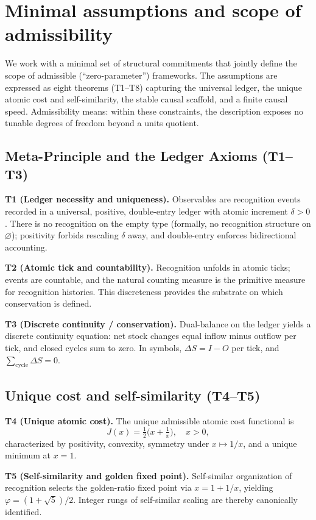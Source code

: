 \documentclass[11pt]{article}
\begin{document}
\section{Minimal assumptions and scope of admissibility}
We work with a minimal set of structural commitments that jointly define the scope of admissible (``zero\mbox{-}parameter'') frameworks. The assumptions are expressed as eight theorems (T1--T8) capturing the universal ledger, the unique atomic cost and self\mbox{-}similarity, the stable causal scaffold, and a finite causal speed. Admissibility means: within these constraints, the description exposes no tunable degrees of freedom beyond a units quotient.

\subsection{Meta\mbox{-}Principle and the Ledger Axioms (T1--T3)}
\textbf{T1 (Ledger necessity and uniqueness).} Observables are recognition events recorded in a universal, positive, double\mbox{-}entry ledger with atomic increment \(\delta>0\). There is no recognition on the empty type (formally, no recognition structure on \(\varnothing\)); positivity forbids rescaling \(\delta\) away, and double\mbox{-}entry enforces bidirectional accounting.

\textbf{T2 (Atomic tick and countability).} Recognition unfolds in atomic ticks; events are countable, and the natural counting measure is the primitive measure for recognition histories. This discreteness provides the substrate on which conservation is defined.

\textbf{T3 (Discrete continuity / conservation).} Dual\mbox{-}balance on the ledger yields a discrete continuity equation: net stock changes equal inflow minus outflow per tick, and closed cycles sum to zero. In symbols, \(\Delta S=I-O\) per tick, and \(\sum_{\text{cycle}}\Delta S=0\).

\subsection{Unique cost and self\mbox{-}similarity (T4--T5)}
\textbf{T4 (Unique atomic cost).} The unique admissible atomic cost functional is
\[ J(x)=\tfrac{1}{2}\bigl(x+\tfrac{1}{x}\bigr), \quad x>0, \]
characterized by positivity, convexity, symmetry under \(x\mapsto 1/x\), and a unique minimum at \(x=1\).

\textbf{T5 (Self\mbox{-}similarity and golden fixed point).} Self\mbox{-}similar organization of recognition selects the golden\mbox{-}ratio fixed point via \(x=1+1/x\), yielding \(\varphi=(1+\sqrt{5})/2\). Integer rungs of self\mbox{-}similar scaling are thereby canonically identified.
\end{document}
